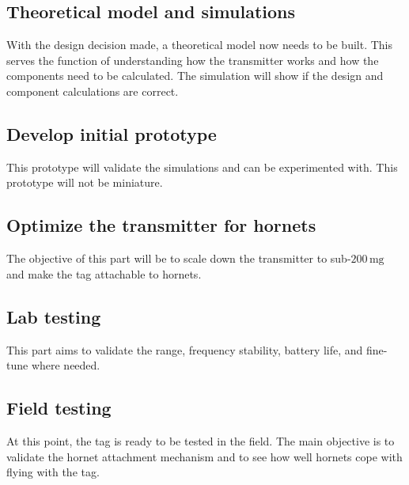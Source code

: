 \subsection{Theoretical model and simulations} 

With the design decision made, a theoretical model now needs to be built. This serves the function of understanding how the transmitter works and how the components need to be calculated. The simulation will show if the design and component calculations are correct.

\subsection{Develop initial prototype}

This prototype will validate the simulations and can be experimented with. This prototype will not be miniature. 

\subsection{Optimize the transmitter for hornets}

The objective of this part will be to scale down the transmitter to sub-$200\,\text{mg}$ and make the tag attachable to hornets.

\subsection{Lab testing}

This part aims to validate the range, frequency stability, battery life, and fine-tune where needed. 

\subsection{Field testing}

At this point, the tag is ready to be tested in the field. The main objective is to validate the hornet attachment mechanism and to see how well hornets cope with flying with the tag.

